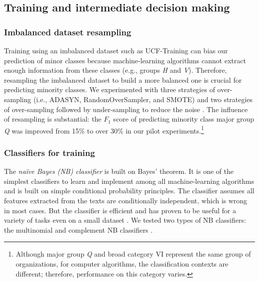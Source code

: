 \documentclass[11pt]{article}
\begin{document}
\subsection{Training and intermediate decision making}

\subsubsection{Imbalanced dataset resampling}

Training using an imbalanced dataset such as UCF-Training can bias our prediction of minor classes because machine-learning algorithms cannot extract enough information from these classes (e.g., groups \textit{H} and \textit{V}). Therefore, resampling the imbalanced dataset to build a more balanced one is crucial for predicting minority classes. We experimented with three strategies of over-sampling (i.e., ADASYN, RandomOverSampler, and SMOTE) and two strategies of over-sampling followed by under-sampling to reduce the noise \parencite[i.e., SMOTEENN and SMOTETomek;][]{LemaitreImbalancedlearnPythonToolbox2017}. The influence of resampling is substantial: the $F_1$ score of predicting minority class major group \textit{Q} was improved from 15\% to over 30\% in our pilot experiments.\footnote{Although major group \textit{Q} and broad category {VI} represent the same group of organizations, for computer algorithms, the classification contexts are different; therefore, performance on this category varies.}

\subsubsection{Classifiers for training}

The \textit{na\"ive Bayes (NB) classifier} is built on Bayes' theorem. It is one of the simplest classifiers to learn and implement among all machine-learning algorithms and is built on simple conditional probability principles. The classifier assumes all features extracted from the texts are conditionally independent, which is wrong in most cases. But the classifier is efficient and has proven to be useful for a variety of tasks even on a small dataset \parencites[][76]{JurafskySpeechLanguageProcessing2017}[][277]{GrimmerTextDataPromise2013}. We tested two types of NB classifiers: the multinomial and complement NB classifiers \parencite{RennieTacklingPoorAssumptions2003}.
\end{document}
